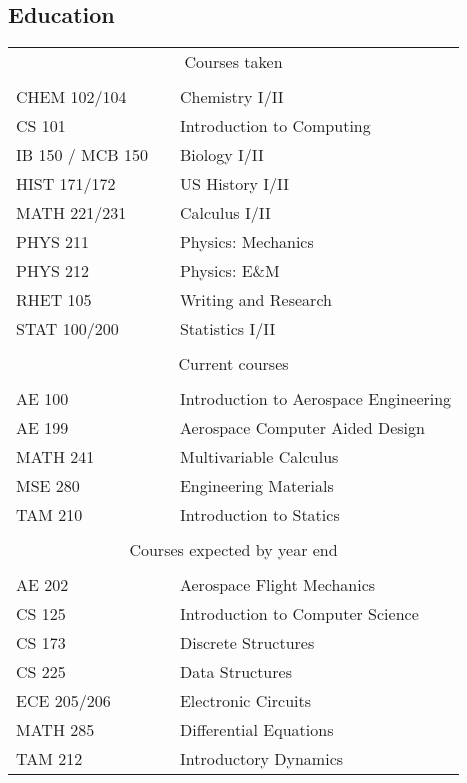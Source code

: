 \documentclass[margin]{res}
\begin{document}
\begin{resume}
\section{Education}
  \begin{tabular}{l p{1in} l}
    \\
    \multicolumn{3}{c}{Courses taken} \\
    \\
    CHEM 102/104 & \hfill & Chemistry I/II \\
    CS 101 & \hfill & Introduction to Computing \\
    IB 150 / MCB 150 & \hfill & Biology I/II \\
    HIST 171/172 & \hfill & US History I/II \\
    MATH 221/231 & \hfill & Calculus I/II \\
    PHYS 211 & \hfill & Physics: Mechanics \\
    PHYS 212 & \hfill & Physics: E\&M \\
    RHET 105 & \hfill & Writing and Research \\
    STAT 100/200 & \hfill & Statistics I/II \\
    \\
    \multicolumn{3}{c}{Current courses} \\
    \\
    AE 100 & \hfill & Introduction to Aerospace Engineering \\
    AE 199 & \hfill & Aerospace Computer Aided Design \\
    MATH 241 & \hfill & Multivariable Calculus \\
    MSE 280 & \hfill & Engineering Materials \\
    TAM 210 & \hfill & Introduction to Statics \\
    \\
    \multicolumn{3}{c}{Courses expected by year end} \\
    \\
    AE 202 & \hfill & Aerospace Flight Mechanics \\
    CS 125 & \hfill & Introduction to Computer Science \\
    CS 173 & \hfill & Discrete Structures \\
    CS 225 & \hfill & Data Structures \\
    ECE 205/206 & \hfill & Electronic Circuits \\
    MATH 285 & \hfill & Differential Equations \\
    TAM 212 & \hfill & Introductory Dynamics \\
  \end{tabular}


\end{resume}
\end{document}
